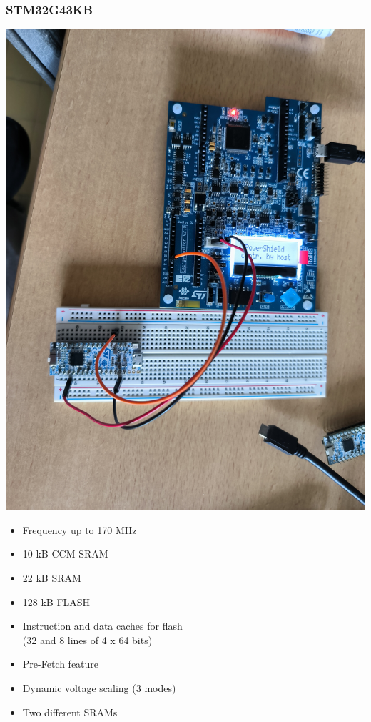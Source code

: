 \documentclass[
	11pt, %
]{beamer}
\begin{document}
\begin{frame}
    \frametitle{STM32G43KB}
	\centering
    \begin{minipage}{0.4\textwidth}
		\includegraphics[scale = 0.04]{images/stm32g.jpg}
	\end{minipage}
	\begin{minipage}{0.50\textwidth}
		\centering
		\begin{itemize}
			\item Frequency up to 170 MHz 
			\item 10 kB CCM-SRAM
			\item 22 kB SRAM 
			\item 128 kB FLASH
			\item Instruction and data caches for flash \\ (32 and 8 lines of 4 x 64 bits) 
			\item Pre-Fetch feature
			\item Dynamic voltage scaling (3 modes)
			\item Two different SRAMs
		\end{itemize}
		\end{minipage}
\end{frame}
\end{document}
